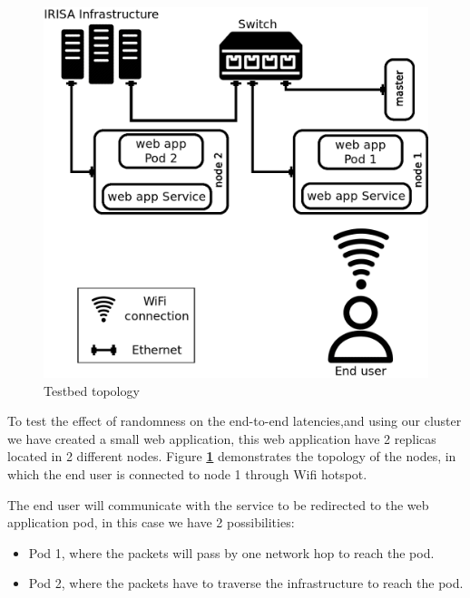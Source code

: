 \documentclass[letterpaper,twocolumn,10pt]{article}
\let\origref\ref
\def\ref#1{\textbf{\origref{#1}}}
\begin{document}
\begin{figure}[tbp]
  \centering
  \includegraphics[width=.9\linewidth]{images/clus.png}
  \caption{Testbed topology}
  \label{fig:clus}
\end{figure}

To test the effect of randomness on the end-to-end latencies,and using our cluster we have created a small web application, this web application have 2 replicas located in 2 different nodes. Figure \ref{fig:clus} demonstrates the topology of the nodes, in which the end user is connected to node 1 through Wifi hotspot.

The end user will communicate with the service to be redirected to the web application pod, in this case we have 2 possibilities: 
\begin{itemize}
\item Pod 1, where the packets will pass by one network hop to reach the pod. 
\item Pod 2, where the packets have to traverse the infrastructure to reach the pod.
\end{itemize}
 
 
\end{document}
